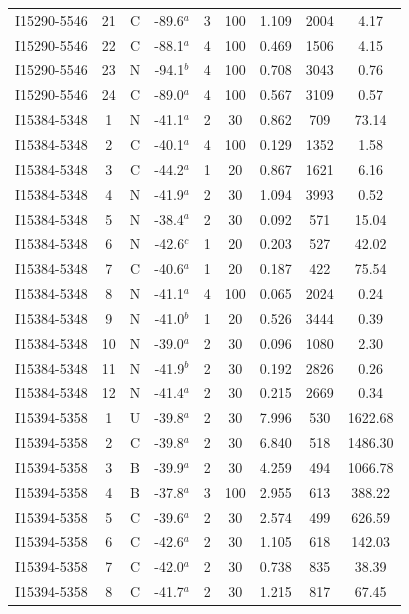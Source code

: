 \begin{table}
\begin{tabular}{ccccccccc}
I15290-5546 & 21 & C & -89.6$^{a}$ & 3 & 100 & 1.109 & 2004 & 4.17 \\
I15290-5546 & 22 & C & -88.1$^{a}$ & 4 & 100 & 0.469 & 1506 & 4.15 \\
I15290-5546 & 23 & N & -94.1$^{b}$ & 4 & 100 & 0.708 & 3043 & 0.76 \\
I15290-5546 & 24 & C & -89.0$^{a}$ & 4 & 100 & 0.567 & 3109 & 0.57 \\
I15384-5348 & 1 & N & -41.1$^{a}$ & 2 & 30 & 0.862 & 709 & 73.14 \\
I15384-5348 & 2 & C & -40.1$^{a}$ & 4 & 100 & 0.129 & 1352 & 1.58 \\
I15384-5348 & 3 & C & -44.2$^{a}$ & 1 & 20 & 0.867 & 1621 & 6.16 \\
I15384-5348 & 4 & N & -41.9$^{a}$ & 2 & 30 & 1.094 & 3993 & 0.52 \\
I15384-5348 & 5 & N & -38.4$^{a}$ & 2 & 30 & 0.092 & 571 & 15.04 \\
I15384-5348 & 6 & N & -42.6$^{c}$ & 1 & 20 & 0.203 & 527 & 42.02 \\
I15384-5348 & 7 & C & -40.6$^{a}$ & 1 & 20 & 0.187 & 422 & 75.54 \\
I15384-5348 & 8 & N & -41.1$^{a}$ & 4 & 100 & 0.065 & 2024 & 0.24 \\
I15384-5348 & 9 & N & -41.0$^{b}$ & 1 & 20 & 0.526 & 3444 & 0.39 \\
I15384-5348 & 10 & N & -39.0$^{a}$ & 2 & 30 & 0.096 & 1080 & 2.30 \\
I15384-5348 & 11 & N & -41.9$^{b}$ & 2 & 30 & 0.192 & 2826 & 0.26 \\
I15384-5348 & 12 & N & -41.4$^{a}$ & 2 & 30 & 0.215 & 2669 & 0.34 \\
I15394-5358 & 1 & U & -39.8$^{a}$ & 2 & 30 & 7.996 & 530 & 1622.68 \\
I15394-5358 & 2 & C & -39.8$^{a}$ & 2 & 30 & 6.840 & 518 & 1486.30 \\
I15394-5358 & 3 & B & -39.9$^{a}$ & 2 & 30 & 4.259 & 494 & 1066.78 \\
I15394-5358 & 4 & B & -37.8$^{a}$ & 3 & 100 & 2.955 & 613 & 388.22 \\
I15394-5358 & 5 & C & -39.6$^{a}$ & 2 & 30 & 2.574 & 499 & 626.59 \\
I15394-5358 & 6 & C & -42.6$^{a}$ & 2 & 30 & 1.105 & 618 & 142.03 \\
I15394-5358 & 7 & C & -42.0$^{a}$ & 2 & 30 & 0.738 & 835 & 38.39 \\
I15394-5358 & 8 & C & -41.7$^{a}$ & 2 & 30 & 1.215 & 817 & 67.45 \\

\end{tabular}
\end{table}
